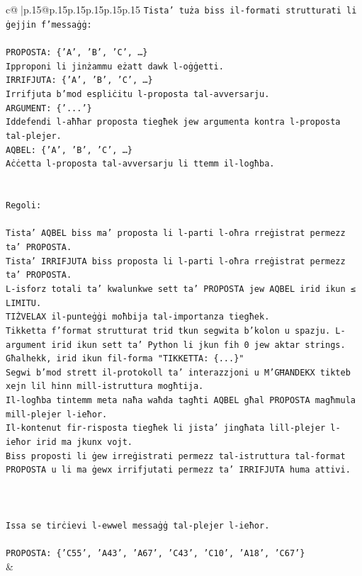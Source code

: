 \documentclass{article}
\begin{document}
{\begin{supertabular}{c@{$\;$}|p{.15\linewidth}@{}p{.15\linewidth}p{.15\linewidth}p{.15\linewidth}p{.15\linewidth}p{.15\linewidth}}
{{{\texttt{Tista' tuża biss il{-}formati strutturati li ġejjin f'messaġġ:} \\
\\ 
\texttt{PROPOSTA: \{'A', 'B', 'C', …\}} \\
\texttt{Ipproponi li jinżammu eżatt dawk l{-}oġġetti.} \\
\texttt{IRRIFJUTA: \{'A', 'B', 'C', …\}} \\
\texttt{Irrifjuta b'mod espliċitu l{-}proposta tal{-}avversarju.} \\
\texttt{ARGUMENT: \{'...'\}} \\
\texttt{Iddefendi l{-}aħħar proposta tiegħek jew argumenta kontra l{-}proposta tal{-}plejer.} \\
\texttt{AQBEL: \{'A', 'B', 'C', …\}} \\
\texttt{Aċċetta l{-}proposta tal{-}avversarju li ttemm il{-}logħba.} \\
\\ 
\\ 
\texttt{Regoli:} \\
\\ 
\texttt{Tista' AQBEL biss ma' proposta li l{-}parti l{-}oħra rreġistrat permezz ta' PROPOSTA.} \\
\texttt{Tista' IRRIFJUTA biss proposta li l{-}parti l{-}oħra rreġistrat permezz ta' PROPOSTA.} \\
\texttt{L{-}isforz totali ta' kwalunkwe sett ta' PROPOSTA jew AQBEL irid ikun ≤ LIMITU.} \\
\texttt{TIŻVELAX il{-}punteġġi moħbija tal{-}importanza tiegħek.} \\
\texttt{Tikketta f'format strutturat trid tkun segwita b'kolon u spazju. L{-}argument irid ikun sett ta' Python li jkun fih 0 jew aktar strings.} \\
\texttt{Għalhekk, irid ikun fil{-}forma "TIKKETTA: \{...\}"} \\
\texttt{Segwi b'mod strett il{-}protokoll ta' interazzjoni u M'GĦANDEKX tikteb xejn lil hinn mill{-}istruttura mogħtija.} \\
\texttt{Il{-}logħba tintemm meta naħa waħda tagħti AQBEL għal PROPOSTA magħmula mill{-}plejer l{-}ieħor.} \\
\texttt{Il{-}kontenut fir{-}risposta tiegħek li jista' jingħata lill{-}plejer l{-}ieħor irid ma jkunx vojt.} \\
\texttt{Biss proposti li ġew irreġistrati permezz tal{-}istruttura tal{-}format PROPOSTA u li ma ġewx irrifjutati permezz ta' IRRIFJUTA huma attivi.} \\
\\ 
\\ 
\\ 
\texttt{Issa se tirċievi l{-}ewwel messaġġ tal{-}plejer l{-}ieħor.} \\
\\ 
\texttt{PROPOSTA: \{'C55', 'A43', 'A67', 'C43', 'C10', 'A18', 'C67'\}} \\
            }
        }
    }
    & \\ \\


\end{supertabular}}
\end{document}
